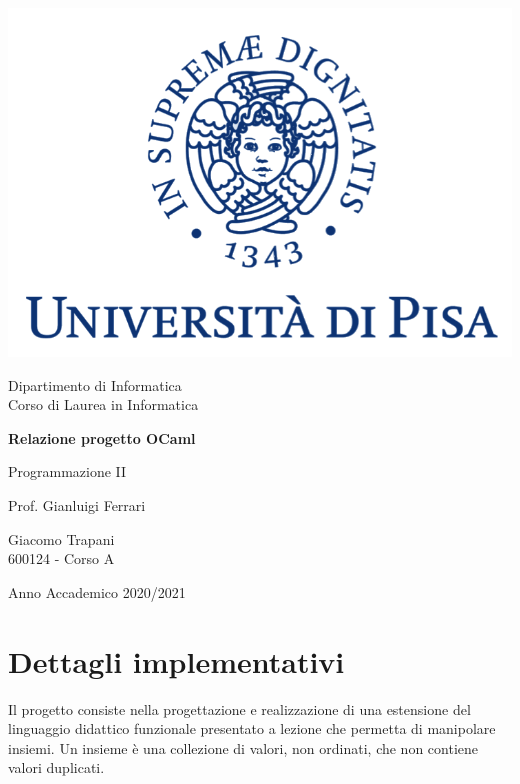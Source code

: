 \documentclass[10pt, italian, openany]{book}
\begin{document}
\begin{titlepage}
	\clearpage\thispagestyle{empty}
	\centering
	\vspace{1cm}

    \includegraphics[scale=0.60]{unipi-logo.png}
    
	{\normalsize \noindent Dipartimento di Informatica \\
	             Corso di Laurea in Informatica \par}
	
	\vspace{2cm}
	{\Huge \textbf{Relazione progetto OCaml} \par}
	\vspace{1cm}
	{\large Programmazione II}
	\vspace{5cm}

    \begin{minipage}[t]{0.47\textwidth}
    	{\large{ Prof. Gianluigi Ferrari}}
    \end{minipage}\hfill\begin{minipage}[t]{0.47\textwidth}\raggedleft
    	{\large {Giacomo Trapani \\ 600124 - Corso A\\ }}
    \end{minipage}

    \vspace{4cm}

	{\normalsize Anno Accademico 2020/2021 \par}

	\pagebreak

\end{titlepage}
\section{Dettagli implementativi}
Il progetto consiste nella progettazione e realizzazione di una estensione del linguaggio didattico funzionale presentato a lezione che permetta di manipolare insiemi. Un insieme \`e una collezione di valori, non ordinati, che non contiene valori duplicati.
\end{document}
